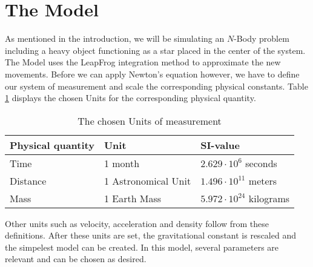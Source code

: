 \section{The Model}
As mentioned in the introduction, we will be simulating an \(N\)-Body problem including a heavy  object functioning as a star placed in the center of the system. 
The Model uses the LeapFrog integration method to approximate the new movements. 
Before we can apply Newton's equation however, we have to define our system of measurement and scale the corresponding physical constants.
Table \ref{tab:eenheden} displays the chosen Units for the corresponding physical quantity.

\begin{table}[h!]
\centering
\caption{The chosen Units of measurement}
\label{tab:eenheden}
\begin{tabular}{l|l|l}
  Physical quantity & Unit & SI-value \\ \hline
Time & 1 month & \(2.629\cdot 10^{6}\) seconds  \\ 
 Distance & 1 Astronomical Unit & \(1.496\cdot10^{11}\) meters   \\
 Mass & 1 Earth Mass & \(5.972\cdot10^{24}\) kilograms \\
\end{tabular}
\end{table}
Other units such as velocity, acceleration and density follow from these definitions. After these units are set, the gravitational constant is rescaled and the simpelest model can be created.
In this model, several parameters are relevant and can be chosen as desired. 
